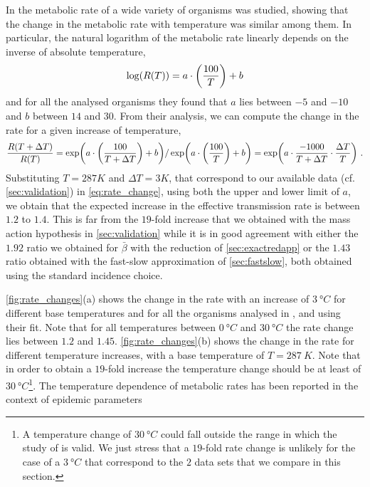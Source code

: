 In \cite{Gillooly2248} the metabolic rate of a wide variety of organisms
was studied, showing that the change in the metabolic rate with temperature was
similar among them. In particular, the natural logarithm of the metabolic rate
linearly depends on the inverse of absolute temperature,
\begin{equation}
    \log(R(T))=a\cdot\left(\frac{100}{T}\right)+b
\end{equation}
and for all the analysed organisms they found that $a$ lies between $-5$
and $-10$ and $b$ between $14$ and $30$. From their analysis, we can compute
the change in the rate for a given increase of temperature,
\begin{equation}\label{eq:rate_change}
    \frac{R(T+\Delta T)}{R(T)}=\exp(a\cdot\left(\frac{100}{T + \Delta
            T}\right)+b) / \exp(a\cdot\left(\frac{100}{T}\right)+b) = \exp(a \cdot
    \frac{-1000}{T+\Delta T}\cdot \frac{\Delta T}{T}) \ .
\end{equation}
Substituting $T=287 K$ and $\Delta T=3 K$, that correspond to our available
data (cf. \cref{sec:validation}) in \cref{eq:rate_change}, using both the upper
and lower limit of $a$, we obtain that the expected increase in the effective
transmission rate is between $1.2$ to $1.4$. This is far from the $19$-fold
increase that we obtained with the mass action hypothesis in
\cref{sec:validation}
while it is in good agreement with either the $1.92$ ratio we obtained	for
$\bar{\beta}$ with the reduction of \cref{sec:exactredapp} or the $1.43$ ratio
obtained with the fast-slow approximation of \cref{sec:fastslow}, both obtained
using the standard incidence choice.

\cref{fig:rate_changes}(a) shows the change in the rate with an increase of
$\SI{3}{\degree C}$ for different base temperatures and for all the organisms
analysed in \cite{Gillooly2248}, and using their fit. Note that for all
temperatures between $\SI{0}{\degree C}$  and $\SI{30}{\degree C}$ the rate
change lies between $1.2$ and $1.45$. \cref{fig:rate_changes}(b) shows the
change in the rate for different temperature increases, with a base temperature
of $T=\SI{287}{K}$. Note that in order to obtain a $19$-fold increase the
temperature change should be at least of $\SI{30}{\degree C}$\footnote{A
    temperature change of $\SI{30}{\degree C}$ could fall outside the range in
    which the study of \cite{Gillooly2248} is valid. We just stress that a
    $19$-fold rate change is unlikely for the case of a $\SI{3}{\degree C}$
    that
    correspond to the $2$ data sets that we compare in this section.}.
The temperature dependence of metabolic rates has been reported in the
context of epidemic parameters \cite{COELHO2006,Shapiro2017}

